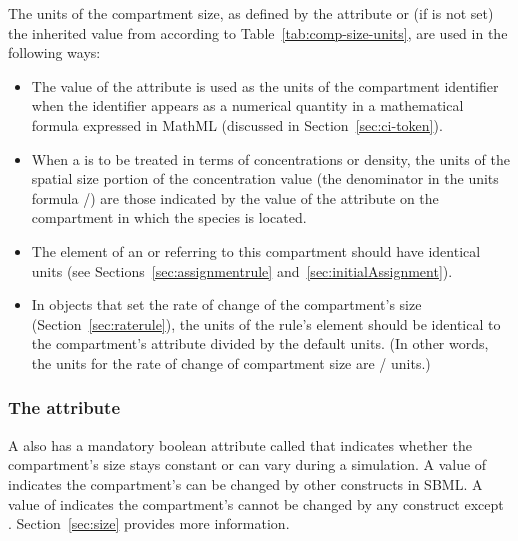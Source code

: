 The units of the compartment size, as defined by the 
attribute or (if  is not set) the inherited value from
\Model according to Table~\vref{tab:comp-size-units}, are used in
the following ways:
\begin{itemize}

\item The value of the  attribute is used
  as the units of the compartment identifier when the identifier
  appears as a numerical quantity in a mathematical formula
  expressed in MathML (discussed in Section~\ref{sec:ci-token}).

\item When a \Species is to be treated in terms of concentrations
  or density, the units of the spatial size portion of the
  concentration value (\ie the denominator in the units formula
  /) are those indicated by the
  value of the  attribute on the compartment in which
  the species is located.

\item The  element of an \AssignmentRule or
  \InitialAssignment referring to this compartment should have
  identical units (see Sections~\ref{sec:assignmentrule}
  and~\ref{sec:initialAssignment}).

\item In \RateRule objects that set the rate of change of the
  compartment's size (Section~\ref{sec:raterule}), the units of
  the rule's  element should be identical to
  the compartment's  attribute divided by
  the default  units.  (In other words, the units
  for the rate of change of compartment size are
  / units.)

\end{itemize}


\subsubsection{The  attribute}
\label{sec:compartment-constant}

A \Compartment also has a mandatory boolean attribute called
 that indicates whether the compartment's size
stays constant or can vary during a simulation.  A value of
 indicates the compartment's  can be
changed by other constructs in SBML.  A value of 
indicates the compartment's  cannot be changed by any
construct except \InitialAssignment.  Section~\ref{sec:size}
provides more information.


